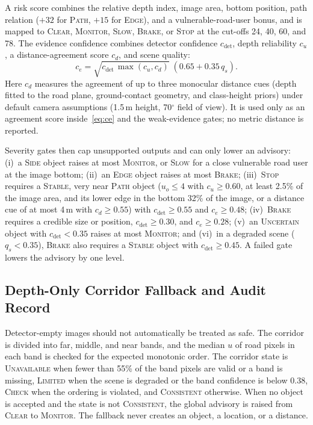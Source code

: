 \documentclass[conference,a4paper]{IEEEtran}
\newcommand{\st}[1]{\textsc{#1}}
\begin{document}
A risk score combines the relative depth index, image area, bottom position, path relation ($+32$ for \st{Path}, $+15$ for \st{Edge}), and a vulnerable-road-user bonus, and is mapped to \st{Clear}, \st{Monitor}, \st{Slow}, \st{Brake}, or \st{Stop} at the cut-offs 24, 40, 60, and 78. The evidence confidence combines detector confidence $c_{\mathrm{det}}$, depth reliability $c_u$, a distance-agreement score $c_d$, and scene quality:
\begin{equation}
c_e=\sqrt{c_{\mathrm{det}}\,\max(c_u,c_d)}\;(0.65+0.35\,q_s).
\label{eq:ce}
\end{equation}
Here $c_d$ measures the agreement of up to three monocular distance cues (depth fitted to the road plane, ground-contact geometry, and class-height priors) under default camera assumptions (1.5\,m height, 70$^\circ$ field of view). It is used only as an agreement score inside~\eqref{eq:ce} and the weak-evidence gates; no metric distance is reported.

Severity gates then cap unsupported outputs and can only lower an advisory: (i)~a \st{Side} object raises at most \st{Monitor}, or \st{Slow} for a close vulnerable road user at the image bottom; (ii)~an \st{Edge} object raises at most \st{Brake}; (iii)~\st{Stop} requires a \st{Stable}, very near \st{Path} object ($u_o\le4$ with $c_u\ge0.60$, at least 2.5\% of the image area, and its lower edge in the bottom 32\% of the image, or a distance cue of at most 4\,m with $c_d\ge0.55$) with $c_{\mathrm{det}}\ge0.55$ and $c_e\ge0.48$; (iv)~\st{Brake} requires a credible size or position, $c_{\mathrm{det}}\ge0.30$, and $c_e\ge0.28$; (v)~an \st{Uncertain} object with $c_{\mathrm{det}}<0.35$ raises at most \st{Monitor}; and (vi)~in a degraded scene ($q_s<0.35$), \st{Brake} also requires a \st{Stable} object with $c_{\mathrm{det}}\ge0.45$. A failed gate lowers the advisory by one level.

\subsection{Depth-Only Corridor Fallback and Audit Record}
Detector-empty images should not automatically be treated as safe. The corridor is divided into far, middle, and near bands, and the median $u$ of road pixels in each band is checked for the expected monotonic order. The corridor state is \st{Unavailable} when fewer than 55\% of the band pixels are valid or a band is missing, \st{Limited} when the scene is degraded or the band confidence is below 0.38, \st{Check} when the ordering is violated, and \st{Consistent} otherwise. When no object is accepted and the state is not \st{Consistent}, the global advisory is raised from \st{Clear} to \st{Monitor}. The fallback never creates an object, a location, or a distance.
\end{document}
